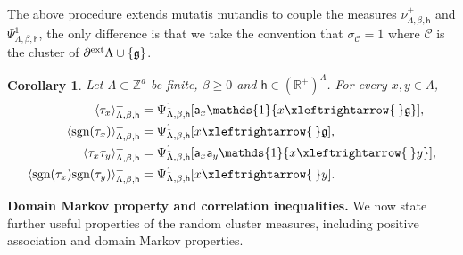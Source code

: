 \documentclass[11pt,a4paper]{article}
\numberwithin{equation}{section}
\theoremstyle{plain}
\newtheorem{Coro}[Thm]{Corollary}
\theoremstyle{definition}
\newcommand{\connect}{\xleftrightarrow}
\begin{document}
The above procedure extends mutatis mutandis to couple the measures $\nu^+_{\Lambda,\beta,\mathsf{h}}$ and $\Psi^1_{\Lambda,\beta,\mathsf{h}}$, the only difference is that we take the convention that $\sigma_\mathcal{C}=1$ where $\mathcal{C}$ is the cluster of $\partial^{\textup{ext}}\Lambda \cup \{\mathfrak g\}$.


\begin{Coro} \label{cor: ES correlations for plus}
Let $\Lambda\subset \mathbb Z^d$ be finite, $\beta\geq 0$ and $\mathsf h \in (\mathbb R^+)^\Lambda$. For every $x,y\in \Lambda$, 
\begin{align}
\label{eq: es cor: 1 plus}
\langle \tau_x \rangle_{\Lambda,\beta,\mathsf{h}}^+
&=
\Psi^1_{\Lambda,\beta,\mathsf{h}}[\mathsf{a}_x \mathds{1}\{x\connect{\:} \mathfrak g \}], 
\\
\label{eq: es cor: 2 plus}
\langle \textup{sgn}(\tau_x) \rangle_{\Lambda,\beta,\mathsf{h}}^+
&=
\Psi^1_{\Lambda,\beta,\mathsf{h}}[x\connect{\:}\mathfrak g], 
\\ \label{eq: es cor: 3 plus}
\langle \tau_x \tau_y \rangle_{\Lambda,\beta,\mathsf{h}}^+
&=
\Psi^1_{\Lambda,\beta,\mathsf{h}}[\mathsf{a}_x \mathsf{a}_y \mathds{1}\{x\connect{\:} y\}], 
\\ \label{eq: es cor: 4 plus}
\langle \textup{sgn}(\tau_x) \textup{sgn}(\tau_y) \rangle_{\Lambda,\beta,\mathsf{h}}^+
&=
\Psi^1_{\Lambda,\beta,\mathsf{h}}[x\connect{\:} y]. 
\end{align} 
\end{Coro}

\hfill

\noindent\textbf{Domain Markov property and correlation inequalities.} We now state further useful properties of the random cluster measures, including positive association and domain Markov properties.
\end{document}

